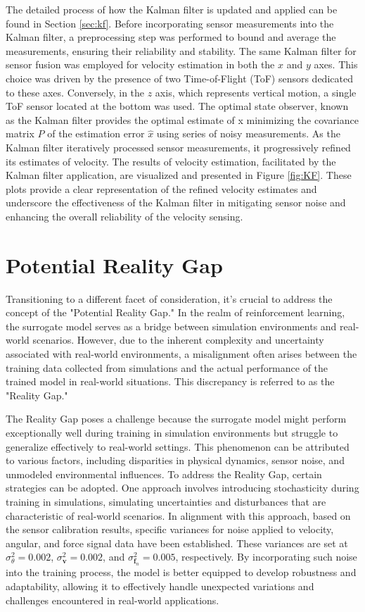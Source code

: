 The detailed process of how the Kalman filter is updated and applied can be found in Section \ref{sec:kf}. Before incorporating sensor measurements into the Kalman filter, a preprocessing step was performed to bound and average the measurements, ensuring their reliability and stability. The same Kalman filter for sensor fusion was employed for velocity estimation in both the $x$ and $y$ axes. This choice was driven by the presence of two Time-of-Flight (ToF) sensors dedicated to these axes. Conversely, in the $z$ axis, which represents vertical motion, a single ToF sensor located at the bottom was used. The optimal state observer, known as the Kalman filter provides the optimal estimate of x minimizing the covariance matrix $P$ of the estimation error $\hat{x}$ using series of noisy measurements. As the Kalman filter iteratively processed sensor measurements, it progressively refined its estimates of velocity.  The results of velocity estimation, facilitated by the Kalman filter application, are visualized and presented in Figure \ref{fig:KF}. These plots provide a clear representation of the refined velocity estimates and underscore the effectiveness of the Kalman filter in mitigating sensor noise and enhancing the overall reliability of the velocity sensing.

\section{Potential Reality Gap}
Transitioning to a different facet of consideration, it's crucial to address the concept of the "Potential Reality Gap." In the realm of reinforcement learning, the surrogate model serves as a bridge between simulation environments and real-world scenarios. However, due to the inherent complexity and uncertainty associated with real-world environments, a misalignment often arises between the training data collected from simulations and the actual performance of the trained model in real-world situations. This discrepancy is referred to as the "Reality Gap."

The Reality Gap poses a challenge because the surrogate model might perform exceptionally well during training in simulation environments but struggle to generalize effectively to real-world settings. This phenomenon can be attributed to various factors, including disparities in physical dynamics, sensor noise, and unmodeled environmental influences. To address the Reality Gap, certain strategies can be adopted. One approach involves introducing stochasticity during training in simulations, simulating uncertainties and disturbances that are characteristic of real-world scenarios. In alignment with this approach, based on the sensor calibration results, specific variances for noise applied to velocity, angular, and force signal data have been established. These variances are set at $\sigma_\theta^2 = 0.002$, $\sigma_{\mathbf{v}}^2 = 0.002$, and $\sigma_{\mathbf{f}_n}^2 = 0.005$, respectively. By incorporating such noise into the training process, the model is better equipped to develop robustness and adaptability, allowing it to effectively handle unexpected variations and challenges encountered in real-world applications.

